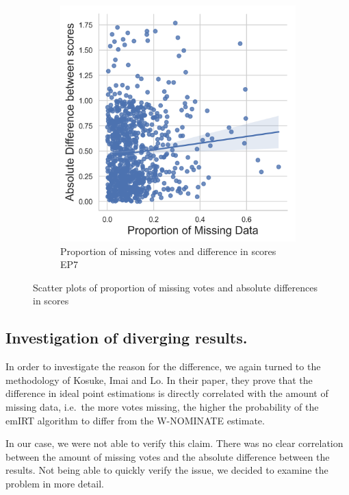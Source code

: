 \documentclass[a4paper,12pt]{report}
\begin{document}
\begin{figure}[H]
\begin{subfigure}[b]{0.48\textwidth}
                        \includegraphics[width=\textwidth]{Graphs/missingvsdiff8}
                        \caption{Proportion of missing votes and difference in scores EP7}
                        \label{fig:missingscatter8}
                    \end{subfigure}
                    \caption{Scatter plots of proportion of missing votes and absolute differences in scores}
                    \label{fig:missingscatters}
                \end{figure}

            \subsection{Investigation of diverging results.}\label{subsec:investigation-of-diverging-results.}
                In order to investigate the reason for the difference, we again turned to the methodology of Kosuke,
                Imai and
                Lo. In their paper, they prove that the difference in ideal point estimations is directly correlated
                with the
                amount of missing data, i.e.\
                the more votes missing, the higher the probability of the emIRT algorithm to differ
                from the W-NOMINATE estimate.

                In our case, we were not able to verify this claim.
                There was no clear correlation between the amount of missing
                votes and the absolute difference between the results.
                Not being able to quickly verify the issue, we decided to
                examine the problem in more detail.
\end{document}
